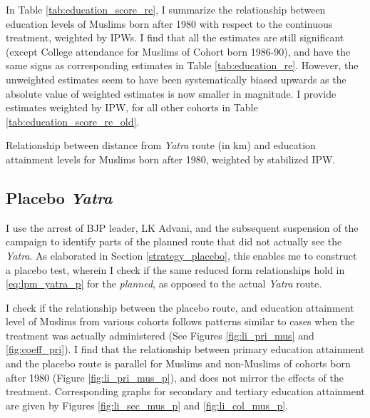 \documentclass{article}
\begin{document}
In Table \ref{tab:education_score_re}, I summarize the relationship between education levels of Muslims born after 1980 with respect to the continuous treatment, weighted by IPWs. I find that all the estimates are still significant (except College attendance for Muslims of Cohort born 1986-90), and have the same signs as corresponding estimates in Table \ref{tab:education_re}. However, the unweighted estimates seem to have been systematically biased upwards as the absolute value of weighted estimates is now smaller in magnitude. I provide estimates weighted by IPW, for all other cohorts in Table \ref{tab:education_score_re_old}. 

\begin{table}[H]
    \centering
    
    \caption{Relationship between distance from \textit{Yatra} route (in km) and education attainment levels for Muslims born after 1980, weighted by stabilized IPW.}
    \label{tab:education_score_re}
\end{table}

\subsection{Placebo \textit{Yatra}}
I use the arrest of BJP leader, LK Advani, and the subsequent suspension of the campaign to identify parts of the planned route that did not actually see the \textit{Yatra}. As elaborated in Section \ref{strategy_placebo}, this enables me to construct a placebo test, wherein I check if the same reduced form relationships hold in \eqref{eq:lpm_yatra_p} for the \textit{planned}, as opposed to the actual \textit{Yatra} route. 

I check if the relationship between the placebo route, and education attainment level of Muslims from various cohorts follows patterns similar to cases when the treatment was actually administered (See Figures \ref{fig:li_pri_mus} and \ref{fig:coeff_pri}). I find that the relationship between primary education attainment and the placebo route is parallel for Muslims and non-Muslims of cohorts born after 1980 (Figure \ref{fig:li_pri_mus_p}), and does not mirror the effects of the treatment. Corresponding graphs for secondary and tertiary education attainment are given by Figures \ref{fig:li_sec_mus_p} and \ref{fig:li_col_mus_p}.
\end{document}
